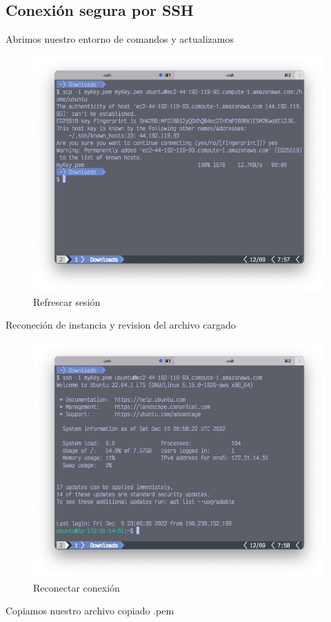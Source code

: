 \subsection{Conexión segura por SSH}
Abrimos nuestro entorno de comandos y actualizamos 
 \clearpage
\begin{figure}[h]
	\centering
	\includegraphics[scale=.35] {img/27-scp-i}
	\caption{Refrescar sesión}
	\label{fig:27}	
\end{figure}
Reconeción de instancia y revision del archivo cargado
\begin{figure}[h]
	\centering
	\includegraphics[scale=.35] {img/28-reconect}
	\caption{Reconectar conexión}
	\label{fig:28}	
\end{figure}
Copiamos nuestro archivo copiado .pem 
 \clearpage 


